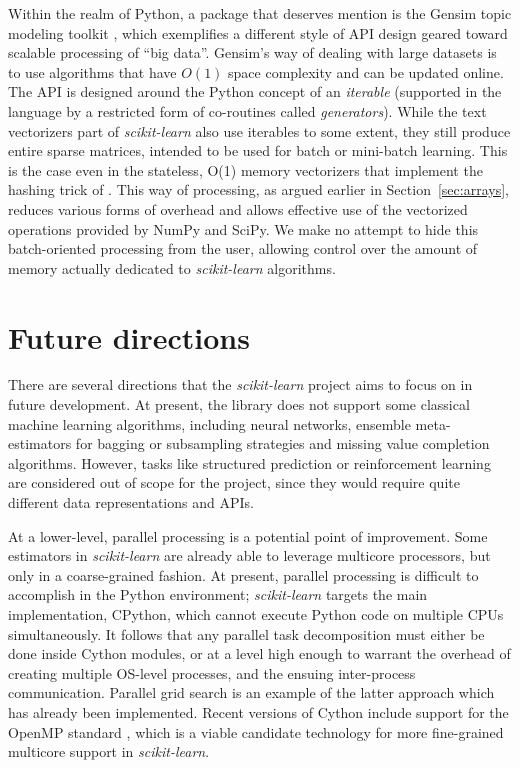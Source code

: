 \documentclass{llncs}
\newcommand{\sklearn}{\textit{scikit-learn}\xspace}
\begin{document}
Within the realm of Python,
a package that deserves mention is the Gensim topic modeling toolkit
\citep{rehurek2010gensim},
which exemplifies a different style of API design
geared toward scalable processing of ``big data''.
Gensim's way of dealing with large datasets is to use algorithms
that have $O(1)$ space complexity and can be updated online.
The API is designed around the Python concept of an \textit{iterable}
(supported in the language by a restricted form of co-routines called
\textit{generators}).
While the text vectorizers part of \sklearn
also use iterables to some extent,
they still produce entire sparse matrices, intended to be used for batch or
mini-batch learning. This is the case
even in the stateless, O(1) memory vectorizers
that implement the hashing trick of \citet{weinberger2009}.
This way of processing, as argued earlier in Section~\ref{sec:arrays},
reduces various forms of overhead
and allows effective use of the vectorized operations provided by NumPy and
SciPy.  We make no attempt to hide this batch-oriented processing from the user,
allowing control over the amount of memory actually dedicated
to \sklearn algorithms.

\section{Future directions}
\label{sec:future_work}
There are several directions that the \sklearn project
aims to focus on in future development.
At present, the library does not support some classical machine learning
algorithms,
including neural networks, ensemble meta-estimators for
bagging or subsampling strategies and missing value completion algorithms.
However, tasks like structured prediction or reinforcement learning are
considered out of scope for the project,
since they would require quite different data representations and APIs.

At a lower-level, parallel processing is a potential point of improvement.
Some estimators in \sklearn are already able to leverage multicore processors,
but only in a coarse-grained fashion.
At present, parallel processing is difficult to accomplish in the Python environment;
\sklearn targets the main implementation, CPython,
which cannot execute Python code on multiple CPUs simultaneously.
It follows that any parallel task decomposition must either be done
inside Cython modules,
or at a level high enough to warrant the overhead
of creating multiple OS-level processes,
and the ensuing inter-process communication.
Parallel grid search is an example of the latter approach
which has already been implemented.
Recent versions of Cython include support for the OpenMP standard
\citep{dagum1998openmp},
which is a viable candidate technology
for more fine-grained multicore support in \sklearn.
\end{document}
